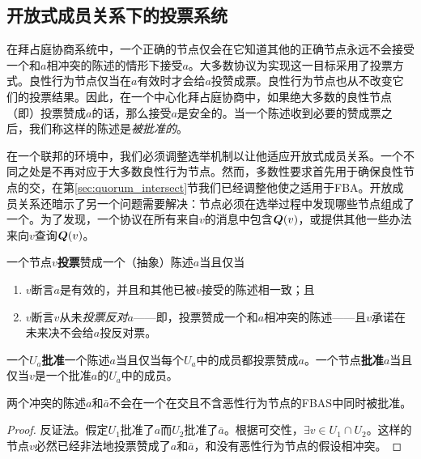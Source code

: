 \subsection{开放式成员关系下的投票系统}

在拜占庭协商系统中，一个正确的节点仅会在它知道其他的正确节点永远不会接受一个和$a$相冲突的陈述的情形下接受$a$。大多数协议为实现这一目标采用了投票方式。良性行为节点仅当在$a$有效时才会给$a$投赞成票。良性行为节点也从不改变它们的投票结果。因此，在一个中心化拜占庭协商中，如果绝大多数的良性节点（即{\quorum}）投票赞成$a$的话，那么接受$a$是安全的。当一个陈述收到必要的赞成票之后，我们称这样的陈述是\textit{被批准的}。

在一个联邦的环境中，我们必须调整选举机制以让他适应开放式成员关系。一个不同之处是{\quorum}不再对应于大多数良性行为节点。然而，多数性要求首先用于确保良性节点的{\quorum}交，在第\ref{sec:quorum_intersect}节我们已经调整他使之适用于FBA。开放成员关系还暗示了另一个问题需要解决：节点必须在选举过程中发现哪些节点组成了一个{\quorum}。为了发现{\quorum}，一个协议在所有来自$v$的消息中包含${\bm Q}(v)$，或提供其他一些办法来向$v$查询${\bm Q}(v)$。

\begin{definition}[投票]
        一个节点$v$\textbf{投票}赞成一个（抽象）陈述$a$当且仅当
        \begin{enumerate}
                \item $v$断言$a$是有效的，并且和其他已被$v$接受的陈述相一致；且
                \item $v$断言$v$从未\textit{投票反对}$a$——即，投票赞成一个和$a$相冲突的陈述——且$v$承诺在未来决不会给$a$投反对票。
        \end{enumerate}
\end{definition}

\begin{definition}[批准]
        一个{\quorum}$U_a$\textbf{批准}一个陈述$a$当且仅当每个$U_a$中的成员都投票赞成$a$。一个节点\textbf{批准}$a$当且仅当$v$是一个批准$a$的{\quorum}$U_a$中的成员。
\end{definition}

\begin{theorem}\label{thm:cannot_ratify_contradictory}
        两个冲突的陈述$a$和$\bar a$不会在一个在{\quorum}交且不含恶性行为节点的FBAS中同时被批准。
\end{theorem}

\begin{proof}
        反证法。假定{\quorum}$U_1$批准了$a$而{\quorum}$U_2$批准了$\bar a$。根据{\quorum}可交性，$\exists v\in U_1\cap U_2$。这样的节点$v$必然已经非法地投票赞成了$a$和$\bar a$，和没有恶性行为节点的假设相冲突。
\end{proof}

